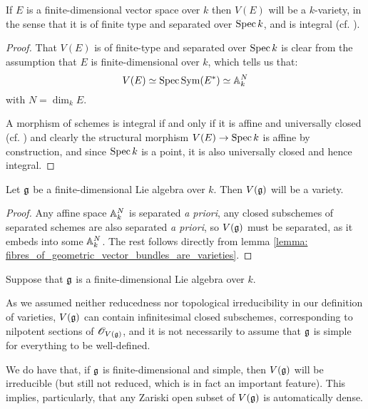         \begin{lemma} \label{lemma: fibres_of_geometric_vector_bundles_are_varieties}
            If $E$ is a finite-dimensional vector space over $k$ then $V(E)$ will be a $k$-variety, in the sense that it is of finite type and separated over $\operatorname{Spec} k$, and is integral (cf. \cite[\href{https://stacks.math.columbia.edu/tag/020D}{Tag 020D}]{stacks}). 
        \end{lemma}
            \begin{proof}
                That $V(E)$ is of finite-type and separated over $\operatorname{Spec} k$ is clear from the assumption that $E$ is finite-dimensional over $k$, which tells us that:
                    $$V(E) \simeq \operatorname{Spec} \mathrm{Sym}(E^*) \simeq \mathbb{A}^N_k$$
                with $N = \dim_k E$. 
            
                A morphism of schemes is integral if and only if it is affine and universally closed (cf. \cite[\href{https://stacks.math.columbia.edu/tag/01WM}{Tag 01WM}]{stacks}) and clearly the structural morphism $V(E) \to \operatorname{Spec} k$ is affine by construction, and since $\operatorname{Spec} k$ is a point, it is also universally closed and hence integral. 
            \end{proof}
        \begin{proposition} \label{prop: varieties_of_finite_dimensional_lie_algebras}
            Let $\mathfrak{g}$ be a finite-dimensional Lie algebra over $k$. Then $V(\mathfrak{g})$ will be a variety. 
        \end{proposition}
            \begin{proof}
                Any affine space $\mathbb{A}_k^N$ is separated \textit{a priori}, any closed subschemes of separated schemes are also separated \textit{a priori}, so $V(\mathfrak{g})$ must be separated, as it embeds into some $\mathbb{A}_k^N$. The rest follows directly from lemma \ref{lemma: fibres_of_geometric_vector_bundles_are_varieties}. 
            \end{proof}
        \begin{remark}
            Suppose that $\mathfrak{g}$ is a finite-dimensional Lie algebra over $k$. 
        
            As we assumed neither reducedness nor topological irreducibility in our definition of varieties, $V(\mathfrak{g})$ can contain infinitesimal closed subschemes, corresponding to nilpotent sections of $\mathscr{O}_{V(\mathfrak{g})}$, and it is not necessarily to assume that $\mathfrak{g}$ is simple for everything to be well-defined. 

            We do have that, if $\mathfrak{g}$ is finite-dimensional and simple, then $V(\mathfrak{g})$ will be irreducible (but still not reduced, which is in fact an important feature). This implies, particularly, that any Zariski open subset of $V(\mathfrak{g})$ is automatically dense.  
        \end{remark}
    
